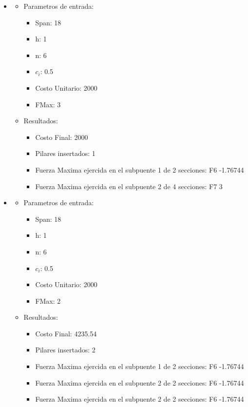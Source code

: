 \begin{itemize}
\begin{itemize}
      \end{itemize}
\item
  \begin{itemize}
    \item Parametros de entrada:
	  \begin{itemize}
	    \item Span: 18
	    \item h: 1
	    \item n: 6
	    \item $c_i$: 0.5
	    \item Costo Unitario: 2000
	    \item FMax: 3
	  \end{itemize}
      \item Resultados:
	  \begin{itemize}
	    \item Costo Final: 2000
	    \item Pilares insertados: 1
	    \item Fuerza Maxima ejercida en el subpuente 1 de 2 secciones: F6 -1.76744
	    \item Fuerza Maxima ejercida en el subpuente 2 de 4 secciones: F7 3
	  \end{itemize}
      \end{itemize}
\item
  \begin{itemize}
    \item Parametros de entrada:
	  \begin{itemize}
	    \item Span: 18
	    \item h: 1
	    \item n: 6
	    \item $c_i$: 0.5
	    \item Costo Unitario: 2000
	    \item FMax: 2
	  \end{itemize}
      \item Resultados:
	  \begin{itemize}
	    \item Costo Final: 4235.54
	    \item Pilares insertados: 2
	    \item Fuerza Maxima ejercida en el subpuente 1 de 2 secciones: F6 -1.76744
	    \item Fuerza Maxima ejercida en el subpuente 2 de 2 secciones: F6 -1.76744
	    \item Fuerza Maxima ejercida en el subpuente 2 de 2 secciones: F6 -1.76744

\end{itemize}
\end{itemize}
\end{itemize}
